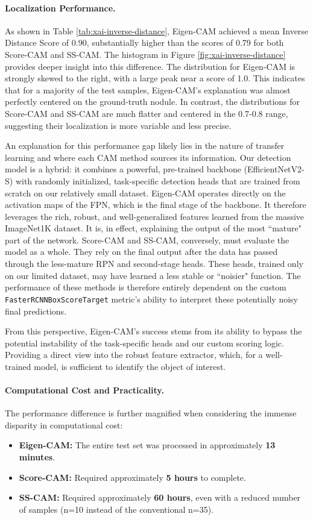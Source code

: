 \paragraph{Localization Performance.}
As shown in Table \ref{tab:xai-inverse-distance}, Eigen-CAM achieved a mean Inverse Distance Score of 0.90, substantially higher than the scores of 0.79 for both Score-CAM and SS-CAM. The histogram in Figure \ref{fig:xai-inverse-distance} provides deeper insight into this difference. The distribution for Eigen-CAM is strongly skewed to the right, with a large peak near a score of 1.0. This indicates that for a majority of the test samples, Eigen-CAM's explanation was almost perfectly centered on the ground-truth nodule. In contrast, the distributions for Score-CAM and SS-CAM are much flatter and centered in the 0.7-0.8 range, suggesting their localization is more variable and less precise.

An explanation for this performance gap likely lies in the nature of transfer learning and where each CAM method sources its information. Our detection model is a hybrid: it combines a powerful, pre-trained backbone (EfficientNetV2-S) with randomly initialized, task-specific detection heads that are trained from scratch on our relatively small dataset.
Eigen-CAM operates directly on the activation maps of the FPN, which is the final stage of the backbone. It therefore leverages the rich, robust, and well-generalized features learned from the massive ImageNet1K dataset. It is, in effect, explaining the output of the most ``mature" part of the network.
Score-CAM and SS-CAM, conversely, must evaluate the model as a whole. They rely on the final output after the data has passed through the less-mature RPN and second-stage heads. These heads, trained only on our limited dataset, may have learned a less stable or ``noisier" function. The performance of these methods is therefore entirely dependent on the custom \texttt{FasterRCNNBoxScoreTarget} metric's ability to interpret these potentially noisy final predictions.
 
From this perspective, Eigen-CAM's success stems from its ability to bypass the potential instability of the task-specific heads and our custom scoring logic. Providing a direct view into the robust feature extractor, which, for a well-trained model, is sufficient to identify the object of interest.

\paragraph{Computational Cost and Practicality.}
The performance difference is further magnified when considering the immense disparity in computational cost:
\begin{itemize}
    \item \textbf{Eigen-CAM:} The entire test set was processed in approximately \textbf{13 minutes}.
    \item \textbf{Score-CAM:} Required approximately \textbf{5 hours} to complete.
    \item \textbf{SS-CAM:} Required approximately \textbf{60 hours}, even with a reduced number of samples (n=10 instead of the conventional n=35).
\end{itemize}

